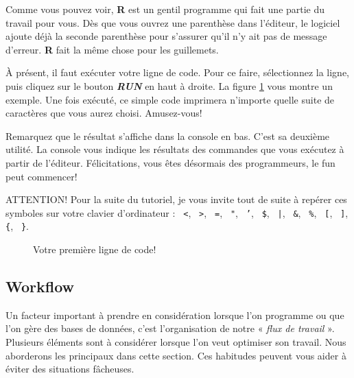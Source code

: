 \documentclass[10.5pt,a4paper]{article}
\newcommand{\rcode}[1]{\texttt{\color{rstudio} #1}}
\begin{document}
 Comme vous pouvez voir, \textbf{R} est un gentil programme qui fait une partie du travail pour vous. Dès que vous ouvrez une parenthèse dans l'éditeur, le logiciel ajoute déjà la seconde parenthèse pour s'assurer qu'il n'y ait pas de message d'erreur. \textbf{R} fait la même chose pour les guillemets. 
   
À présent, il faut exécuter votre ligne de code. Pour ce faire, sélectionnez la ligne, puis cliquez sur le bouton \textit{\textbf{RUN}} en haut à droite. La figure \ref{rstudio4} vous montre un exemple. Une fois exécuté, ce simple code imprimera n'importe quelle suite de caractères que vous aurez choisi. Amusez-vous!

Remarquez que le résultat s'affiche dans la console en bas. C'est sa deuxième utilité. La console vous indique les résultats des commandes que vous exécutez à partir de l'éditeur. Félicitations, vous êtes désormais des programmeurs, le fun peut commencer! 

ATTENTION! Pour la suite du tutoriel, je vous invite tout de suite à repérer ces symboles sur votre clavier d'ordinateur : \rcode{<}, \rcode{>}, \rcode{=}, \rcode{"}, \rcode{'}, \rcode{\$}, \rcode{|}, \rcode{\&}, \rcode{\%}, \rcode{[}, \rcode{]}, \rcode{\{}, \rcode{\}}.

\begin{figure}[H]
  \centering
  \caption{Votre première ligne de code!}
  \label{rstudio4}
\end{figure}

  \subsection{Workflow}
  
  Un facteur important à prendre en considération lorsque l'on programme ou que l'on gère des bases de données, c'est l'organisation de notre « \emph{flux de travail} ». Plusieurs éléments sont à considérer lorsque l'on veut optimiser son travail. Nous aborderons les principaux dans cette section. Ces habitudes peuvent vous aider à éviter des situations fâcheuses.
  
\end{document}
